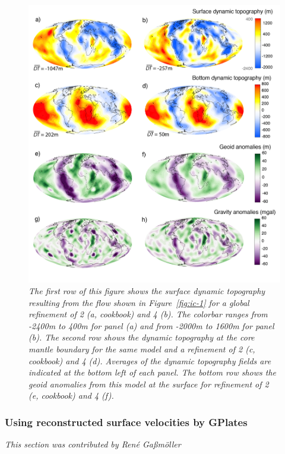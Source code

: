 \documentclass{article}
\begin{document}
\begin{figure}
  \includegraphics[width=\textwidth]{cookbooks/initial-condition-S20RTS/Fig_cookbook_V4-02.png}
  \hfill
  \caption{\it The first row of this figure shows the surface dynamic topography resulting 
  from the flow shown in Figure~\ref{fig:ic-1} for a global 
  refinement of 2 (a, cookbook) and 4 (b). The colorbar ranges from -2400m to 400m for panel (a) and
  from -2000m to 1600m for panel (b). The second row shows the dynamic topography at
  the core mantle boundary for the same model and a refinement of 2 (c, cookbook) and 4 (d). Averages of the 
  dynamic topography fields are indicated at the bottom left of each panel. The bottom row shows the
  geoid anomalies from this model at the surface for refinement of 2 (e, cookbook) and 4 (f).}
  \label{fig:ic-2}
\end{figure}

\subsubsection{Using reconstructed surface velocities by GPlates}
\label{sec:cookbooks-gplates}
\textit{This section was contributed by Ren{\'e} Ga{\ss}m{\"o}ller}
\end{document}

